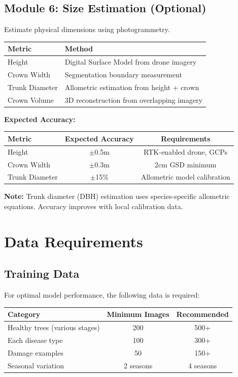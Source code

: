 \documentclass[11pt,a4paper]{article}
\begin{document}
\subsection{Module 6: Size Estimation (Optional)}

Estimate physical dimensions using photogrammetry.

\begin{center}
\begin{tabular}{ll}
\toprule
\textbf{Metric} & \textbf{Method} \\
\midrule
Height & Digital Surface Model from drone imagery \\
Crown Width & Segmentation boundary measurement \\
Trunk Diameter & Allometric estimation from height + crown \\
Crown Volume & 3D reconstruction from overlapping imagery \\
\bottomrule
\end{tabular}
\end{center}

\textbf{Expected Accuracy:}
\begin{center}
\begin{tabular}{lcc}
\toprule
\textbf{Metric} & \textbf{Expected Accuracy} & \textbf{Requirements} \\
\midrule
Height & $\pm$0.5m & RTK-enabled drone, GCPs \\
Crown Width & $\pm$0.3m & 2cm GSD minimum \\
Trunk Diameter & $\pm$15\% & Allometric model calibration \\
\bottomrule
\end{tabular}
\end{center}

\textbf{Note:} Trunk diameter (DBH) estimation uses species-specific allometric equations. Accuracy improves with local calibration data.

\section{Data Requirements}

\subsection{Training Data}

For optimal model performance, the following data is required:

\begin{center}
\begin{tabular}{lcc}
\toprule
\textbf{Category} & \textbf{Minimum Images} & \textbf{Recommended} \\
\midrule
Healthy trees (various stages) & 200 & 500+ \\
Each disease type & 100 & 300+ \\
Damage examples & 50 & 150+ \\
Seasonal variation & 2 seasons & 4 seasons \\
\bottomrule
\end{tabular}
\end{center}
\end{document}
